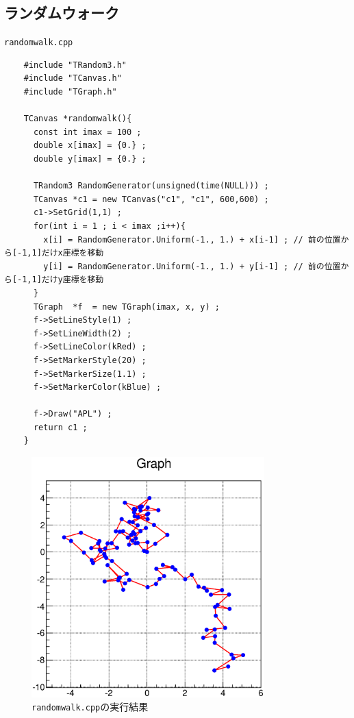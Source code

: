   \subsection{ランダムウォーク}
  \begin{itembox}{\texttt{randomwalk.cpp}}
\begin{verbatim}
	#include "TRandom3.h"
	#include "TCanvas.h"
	#include "TGraph.h"

	TCanvas *randomwalk(){
	  const int imax = 100 ;
	  double x[imax] = {0.} ;
	  double y[imax] = {0.} ;

	  TRandom3 RandomGenerator(unsigned(time(NULL))) ;
	  TCanvas *c1 = new TCanvas("c1", "c1", 600,600) ;
	  c1->SetGrid(1,1) ;  
	  for(int i = 1 ; i < imax ;i++){
	    x[i] = RandomGenerator.Uniform(-1., 1.) + x[i-1] ; // 前の位置から[-1,1]だけx座標を移動
	    y[i] = RandomGenerator.Uniform(-1., 1.) + y[i-1] ; // 前の位置から[-1,1]だけy座標を移動
	  }
	  TGraph  *f  = new TGraph(imax, x, y) ;
	  f->SetLineStyle(1) ;
	  f->SetLineWidth(2) ;
	  f->SetLineColor(kRed) ;
	  f->SetMarkerStyle(20) ;
	  f->SetMarkerSize(1.1) ;
	  f->SetMarkerColor(kBlue) ;

	  f->Draw("APL") ;
	  return c1 ;
	}
\end{verbatim}
  \end{itembox}
  \begin{figure}[htbp]
   \begin{center}
    \includegraphics[width = 90mm]{./picture/randomwalkcanvas1.eps}
   \end{center}
   \caption{\texttt{randomwalk.cpp}の実行結果}
   \label{Fig:randomwalkcanvas1}
  \end{figure}

